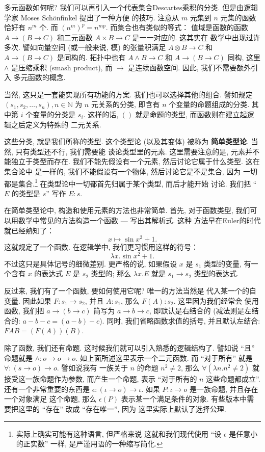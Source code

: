 \documentclass[UTF8]{ctexbook}
\theoremstyle{plain}
\theoremstyle{definition}
\theoremstyle{remark}
\begin{document}
多元函数如何呢? 我们可以再引入一个代表集合Descartes乘积的分类.
但是由逻辑学家 Moses Sch\"onfinkel 提出了一种方便
的技巧. 注意从 \(m\) 元集到 \(n\)
元集的函数恰好有 \(n^m\) 个. 而 \((n^m)^p = n^{mp}\).
而集合也有类似的等式： 值域是函数的函数 \(A \to (B \to C)\)
和二元函数 \(A \times B \to C\) 是一一对应的. 这其实在
数学中出现过许多次. 譬如向量空间 (或一般来说, 模) 的张量积满足
\(A \otimes B \to C\) 和 \(A \to (B \to C)\) 是同构的.
拓扑中也有 \(A \wedge B \to C\) 和 \(A \to (B \to C)\)
同构, 这里 \(\wedge\) 是压缩乘积 (smash product), 而
\(\to\) 是连续函数空间. 因此, 我们不需要额外引入
多元函数的概念.

当然, 这只是一套能实现所有功能的方案. 我们也可以选择其他的组合.
譬如规定 \((s_1, s_2, \dots, s_n), n\in\mathbb N\) 为
\(n\) 元关系的分类, 即含有 \(n\) 个变量的命题组成的分类.
其中第 \(i\) 个变量的分类是 \(s_i\). 这样的话,
\(()\) 就是命题的类型, 而函数则在建立起逻辑之后定义为特殊的
二元关系.

这些分类, 就是我们所称的类型. 这个类型论 (以及其变体) 被称为%
\textbf{简单类型论}. 当然, 只有类型还不行, 我们需要能
谈论类型里的元素. 这里需要注意的是, 元素并不能独立于类型而存在.
我们不能先假设有一个元素, 然后讨论它属于什么类型. 这在集合论中
是一样的, 我们不能假设有一个物体, 然后讨论它是不是集合, 因为
一切都是集合.\footnote{实际上确实可能有这种语言, 但严格来说
这就和我们现代使用 “设 \(\epsilon\) 是任意小的正实数” 一样,
是严谨用语的一种缩写简化.} 在类型论中一切都首先归属于某个类型, 而后才能开始
讨论. 我们把 “\(E\) 的类型是 \(s\)” 写作 \(E : s\).

在简单类型论中, 构造和使用元素的方法也非常简单. 首先, 对于函数类型,
我们可以用数学中常见的方法构造一个函数 --- 写出其解析式. 这种
方法早在Euler的时代就已经熟知了：
\[x \mapsto \sin x^2 + 1.\]
这就规定了一个函数. 在逻辑学中, 我们更习惯用这样的符号：
\[\lambda x. \sin x^2 + 1.\]
不过这只是具体记号的细微差别. 更严格的说, 如果假设 \(x\) 是
\(s_1\) 类型的变量, 有一个含有 \(x\) 的表达式 \(E\) 是
\(s_2\) 类型的; 那么 \(\lambda x. E\) 就是 \(s_1 \to s_2\)
类型的表达式.

反过来, 我们有了一个函数, 要如何使用它呢? 唯一的方法当然是
代入某一个的自变量. 因此如果 \(F : s_1 \to s_2\), 并且
\(A : s_1\), 那么 \(F(A) : s_2\). 这里因为我们经常会
使用函数, 我们把 \(a \to (b \to c)\) 简写为 \(a \to b \to c\),
即默认是右结合的 (减法则是左结合的: \(a - b - c = (a - b) - c\)).
同时, 我们省略函数求值的括号, 并且默认左结合: \(FAB = (F(A))(B)\).

除了函数, 我们还有命题. 这时候我们就可以引入熟悉的逻辑结构了.
譬如说 “且” 命题就是 \(\wedge : o \to o \to o\).
如上面所述这里表示一个二元函数. 而 “对于所有” 就是
\(\forall : (s \to o) \to o\). 譬如说我有
一族关于 \(n\) 的命题 \(n^2 \ne 2\),
那么 \(\forall (\lambda n. n^2 \ne 2)\)
就接受这一族命题作为参数, 而产生一个命题, 表示 “对于所有的
\(n\) 这些命题都成立”. 还有一个非常重要的东西是
\(\epsilon : (\iota \to o) \to \iota\). 如果
\(P : \iota \to o\) 是一族命题, 并且存在一个对象满足
这个命题, 那么 \(\epsilon(P)\) 表示某一个满足条件的对象.
有些版本中需要把这里的 “存在” 改成 “存在唯一”, 因为
这里实际上默认了选择公理.
\end{document}
